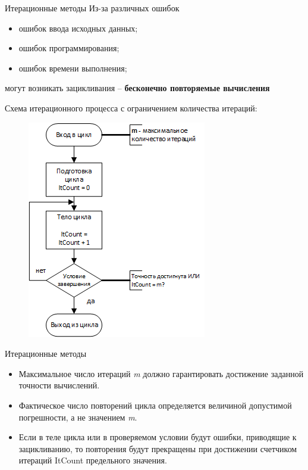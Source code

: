 \documentclass{beamer}
\begin{document}
\begin{frame}{Итерационные методы}
Из-за различных ошибок
\begin{itemize}
\item ошибок ввода исходных данных;
\item ошибок программирования;
\item ошибок времени выполнения; 
\end{itemize}
могут возникать зацикливания – \textbf{бесконечно повторяемые вычисления}
\end{frame}

\begin{frame}
Схема итерационного процесса с ограничением количества итераций:
\begin{figure}[h]
\centering
\includegraphics[scale=0.75]{images/lec05-pic02.png}
\end{figure}
\end{frame} 

\begin{frame}{Итерационные методы}
\begin{itemize}
\item Максимальное число итераций \textit{m} должно гарантировать достижение заданной точности вычислений. 
\item Фактическое число повторений цикла определяется величиной допустимой погрешности, а не значением \textit{m}. 
\item Если в теле цикла или в проверяемом условии будут ошибки, приводящие к зацикливанию, то повторения будут
прекращены при достижении счетчиком итераций ItCount предельного значения.
\end{itemize}
\end{frame}
\end{document}
